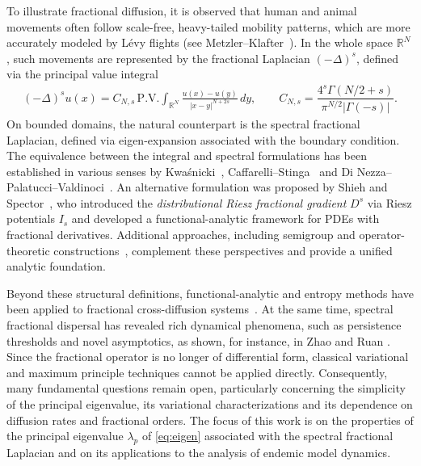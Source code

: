 \documentclass[a4paper,11pt]{amsart}
\theoremstyle{definition}
\numberwithin{equation}{section}
\theoremstyle{definition}
\begin{document}
To illustrate fractional diffusion, it is observed that human and animal movements often follow scale-free, heavy-tailed mobility patterns, which are more accurately modeled by Lévy flights (see Metzler–Klafter~\cite{metzler_random_2000}). In the whole space $\mathbb{R}^N$, such movements are represented by the fractional Laplacian $(-\Delta)^s$, defined via the principal value integral
\begin{align*}
(-\Delta)^s u(x) = C_{N,s}\,\mathrm{P.V.}\!\int_{\mathbb{R}^N}\frac{u(x)-u(y)}{|x-y|^{N+2s}}\,dy, \qquad 
C_{N,s}=\dfrac{4^s\Gamma(N/2+s)}{\pi^{N/2}|\Gamma(-s)|}.
\end{align*}
On bounded domains, the natural counterpart is the spectral fractional Laplacian, defined via eigen-expansion associated with the boundary condition. The equivalence between the integral and spectral formulations has been established in various senses by Kwaśnicki~\cite{Kwaśnicki_2017}, Caffarelli–Stinga~\cite{caffarelli_fractional_2016} and Di Nezza–Palatucci–Valdinoci~\cite{di_hitchhiker_2012}. An alternative formulation was proposed by Shieh and Spector~\cite{on_shieh_2015,on_shieh_2018}, who introduced the {\it distributional Riesz fractional gradient} $D^s$ via Riesz potentials $I_s$ and developed a functional-analytic framework for PDEs with fractional derivatives. Additional approaches, including semigroup and operator-theoretic constructions~\cite{stinga_fractional_2015,Martínez_theory_2001}, complement these perspectives and provide a unified analytic foundation.

Beyond these structural definitions, functional-analytic and entropy methods have been applied to fractional cross-diffusion systems~\cite{jungel_analysis_2022}. At the same time, spectral fractional dispersal has revealed rich dynamical phenomena, such as persistence thresholds and novel asymptotics, as shown, for instance, in Zhao and Ruan \cite{zhao_spatiotemporal_2023,zhao_spatiotemporal_2025}. Since the fractional operator is no longer of differential form, classical variational and maximum principle techniques cannot be applied directly. Consequently, many fundamental questions remain open, particularly concerning the simplicity of the principal eigenvalue, its variational characterizations and its dependence on diffusion rates and fractional orders. The focus of this work is on the properties of the principal eigenvalue $\lambda_p$ of \eqref{eq:eigen} associated with the spectral fractional Laplacian and on its applications to the analysis of endemic model dynamics.
\end{document}

